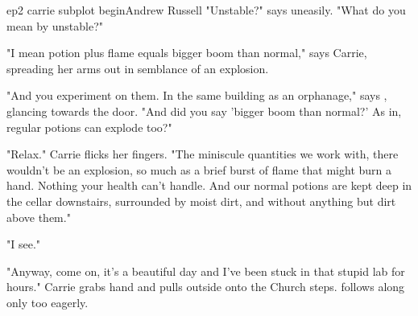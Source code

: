 \documentclass{book}
\begin{document}
\begin{childnode}{ep2 carrie subplot begin}{Andrew Russell}
    "Unstable?" says \name{} uneasily. "What do you mean by unstable?"

    "I mean potion plus flame equals bigger boom than normal," says Carrie, spreading her arms out in semblance of an explosion. 

    "And you experiment on them. In the same building as an orphanage," says \name{}, glancing towards the door. "And did you say 'bigger boom than normal?' As in, regular potions can explode too?"

    "Relax." Carrie flicks her fingers. "The miniscule quantities we work with, there wouldn't be an explosion, so much as a brief burst of flame that might burn a hand. 
    Nothing your health can't handle. And our normal potions are kept deep in the cellar downstairs, surrounded by moist dirt, and without anything but dirt above them."

    "I see."

    "Anyway, come on, it's a beautiful day and I've been stuck in that stupid lab for hours." Carrie grabs \names{} hand and pulls \himher{} outside onto the Church steps. \name{} follows along 
    only too eagerly.


\end{childnode}
\end{document}
